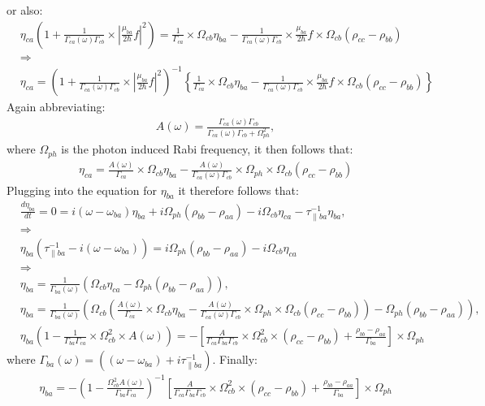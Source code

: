 \documentclass[10pt,letterpaper]{article}
\begin{document}
	or also:
	\begin{align}
	&\eta_{ca}\left(1+\frac{1}{\Gamma_{ca}(\omega)\Gamma_{cb}}\times|\frac{\mu_{ba}}{2 \hbar}f|^2 \right)=  \frac{1}{ \Gamma_{ca} } \times \Omega_{cb}\eta_{ba} - \frac{1}{\Gamma_{ca}(\omega)\Gamma_{cb}}\times \frac{\mu_{ba}}{2 \hbar}f\times \Omega_{cb}(\rho_{cc} - \rho_{bb}) \\ 
	&\Rightarrow \\
	&\eta_{ca}= \left(1+\frac{1}{\Gamma_{ca}(\omega)\Gamma_{cb}}\times|\frac{\mu_{ba}}{2 \hbar}f|^2 \right)^{-1} \left\{ \frac{1}{ \Gamma_{ca} } \times \Omega_{cb}\eta_{ba} - \frac{1}{\Gamma_{ca}(\omega)\Gamma_{cb}}\times \frac{\mu_{ba}}{2 \hbar}f\times \Omega_{cb}(\rho_{cc} - \rho_{bb})\right\} 
	\end{align}
	Again abbreviating:
	\begin{align}
	& A(\omega) = \frac{\Gamma_{ca}(\omega)\Gamma_{cb}}{\Gamma_{ca}(\omega)\Gamma_{cb}+\Omega_{ph}^2},
	\end{align}
	where $\Omega_{ph}$ is the photon induced Rabi frequency, it then follows that:
	\begin{align}
	&\eta_{ca}=  \frac{A(\omega)}{ \Gamma_{ca} } \times \Omega_{cb}\eta_{ba} - \frac{A(\omega)}{\Gamma_{ca}(\omega)\Gamma_{cb}}\times \Omega_{ph}\times \Omega_{cb}(\rho_{cc} - \rho_{bb})
	\end{align}
	Plugging into the equation for $\eta_{ba}$ it therefore follows that:
	\begin{align}
	&\frac{d \eta_{ba}}{d t}   = 0 = i(\omega - \omega_{ba})\eta_{ba} +i \Omega_{ph}(\rho_{bb}-\rho_{aa}) - i\Omega_{cb}\eta_{ca} - \tau_{\parallel ba}^{-1}\eta_{ba}, \\
	&\Rightarrow \nonumber \\
	&\eta_{ba} (\tau_{\parallel ba}^{-1}-i(\omega - \omega_{ba})) = i\Omega_{ph}(\rho_{bb}-\rho_{aa}) - i\Omega_{cb}\eta_{ca} \\ 
	&\Rightarrow \nonumber \\
	&\eta_{ba} = \frac{1}{\Gamma_{ba}(\omega) }  \left(\Omega_{cb}\eta_{ca}-\Omega_{ph}(\rho_{bb}-\rho_{aa}) \right), \\ 
	&\eta_{ba} = \frac{1}{\Gamma_{ba}(\omega) }  \left(\Omega_{cb}\left(\frac{A(\omega)}{ \Gamma_{ca} } \times \Omega_{cb}\eta_{ba} - \frac{A(\omega)}{\Gamma_{ca}(\omega)\Gamma_{cb}}\times \Omega_{ph}\times \Omega_{cb}(\rho_{cc} - \rho_{bb})\right)-\Omega_{ph}(\rho_{bb}-\rho_{aa}) \right), \\ 
	&\eta_{ba}(1-\frac{1}{\Gamma_{ba}\Gamma_{ca}}\times\Omega_{cb}^2 \times A(\omega)) = -\left [ \frac{A}{\Gamma_{ca}\Gamma_{ba}\Gamma_{cb}}\times \Omega_{cb}^2\times(\rho_{cc}-\rho_{bb}) +\frac{\rho_{bb}-\rho_{aa}}{\Gamma_{ba}} \right]\times\Omega_{ph}
	\end{align}
	where $  \Gamma_{ba}(\omega) = ((\omega - \omega_{ba})+i\tau_{\parallel ba}^{-1}). $ Finally:
	\begin{align}
	&\eta_{ba} =-(1-\frac{\Omega_{cb}^2  A(\omega)}{\Gamma_{ba}\Gamma_{ca}})^{-1} \left [ \frac{A}{\Gamma_{ca}\Gamma_{ba}\Gamma_{cb}}\times \Omega_{cb}^2\times(\rho_{cc}-\rho_{bb}) +\frac{\rho_{bb}-\rho_{aa}}{\Gamma_{ba}} \right]\times\Omega_{ph}
	\end{align}
	
\end{document}
